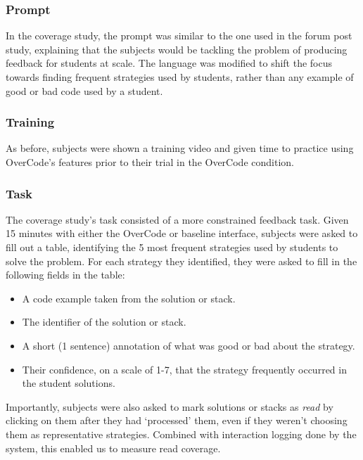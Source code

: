 \subsubsection{Prompt}
In the coverage study, the prompt was similar to the one used in the forum post study, explaining that the subjects would be tackling the problem of producing feedback for students at scale. The language was modified to shift the focus towards finding frequent strategies used by students, rather than any example of good or bad code used by a student.

\subsubsection{Training}
As before, subjects were shown a training video and given time to practice using OverCode's features prior to their trial in the OverCode condition.

\subsubsection{Task}
The coverage study's task consisted of a more constrained feedback task. Given 15 minutes with either the OverCode or baseline interface, subjects were asked to fill out a table, identifying the 5 most frequent strategies used by students to solve the problem. For each strategy they identified, they were asked to fill in the following fields in the table:
\begin{itemize}
\item A code example taken from the solution or stack.
\item The identifier of the solution or stack.
\item A short (1 sentence) annotation of what was good or bad about the strategy.
\item Their confidence, on a scale of 1-7, that the strategy frequently occurred in the student solutions.
\end{itemize}
Importantly, subjects were also asked to mark solutions or stacks as \emph{read} by clicking on them after they had `processed' them, even if they weren't choosing them as representative strategies. Combined with interaction logging done by the system, this enabled us to measure read coverage.

